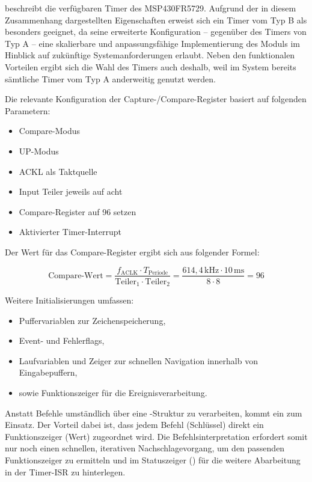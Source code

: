  beschreibt die verf\"ugbaren Timer des MSP430FR5729. Aufgrund der in diesem Zusammenhang dargestellten Eigenschaften erweist sich ein Timer vom Typ B als besonders geeignet, da seine erweiterte Konfiguration -- gegen\"uber des Timers von Typ A -- eine skalierbare und anpassungsf\"ahige Implementierung des Moduls im Hinblick auf zuk\"unftige Systemanforderungen erlaubt. Neben den funktionalen Vorteilen ergibt sich die Wahl des Timers auch deshalb, weil im System bereits s\"amtliche Timer vom Typ A anderweitig genutzt werden.

\newpage
Die relevante Konfiguration der Capture-/Compare-Register basiert auf folgenden Parametern:

\begin{multicols}{2}
	\begin{itemize}
		\item Compare-Modus
		\item UP-Modus
		\item ACKL als Taktquelle
	\end{itemize}	
\vfill\null
\columnbreak
	\begin{itemize}	
		\item Input Teiler jeweils auf acht
		\item Compare-Register auf 96 setzen
		\item Aktivierter Timer-Interrupt
	\end{itemize}
\vfill\null	
\end{multicols}

Der Wert f\"ur das Compare-Register ergibt sich aus folgender Formel:

\[
\text{Compare-Wert} = \frac{f_\text{ACLK} \cdot T_\text{Periode}}{\text{Teiler}_1 \cdot \text{Teiler}_2} = \frac{614{,}4\,\text{kHz} \cdot 10\,\text{ms}}{8 \cdot 8} = 96
\]

Weitere Initialisierungen umfassen:
\begin{itemize}
	\item Puffervariablen zur Zeichenspeicherung,
	\item Event- und Fehlerflags,
	\item Laufvariablen und Zeiger zur schnellen Navigation innerhalb von Eingabepuffern,
	\item sowie Funktionszeiger f\"ur die Ereignisverarbeitung.
\end{itemize}

Anstatt Befehle umst\"andlich \"uber eine -Struktur zu verarbeiten, kommt ein  zum Einsatz. Der Vorteil dabei ist, dass jedem Befehl (Schl\"ussel) direkt ein Funktionszeiger (Wert) zugeordnet wird. Die Befehlsinterpretation erfordert somit nur noch einen schnellen, iterativen Nachschlagevorgang, um den passenden Funktionszeiger zu ermitteln und im Statuszeiger () f\"ur die weitere Abarbeitung in der Timer-ISR zu hinterlegen.

